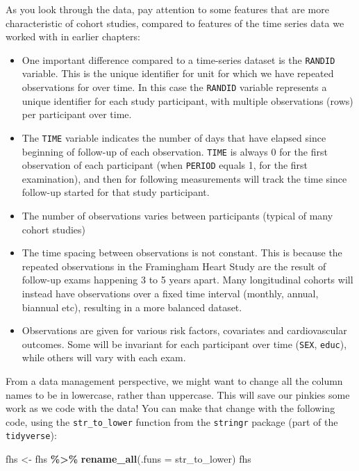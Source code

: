 \documentclass[
]{book}
\newenvironment{Shaded}{\begin{snugshade}}{\end{snugshade}}
\newcommand{\AttributeTok}[1]{\textcolor[rgb]{0.13,0.29,0.53}{#1}}
\newcommand{\FunctionTok}[1]{\textcolor[rgb]{0.13,0.29,0.53}{\textbf{#1}}}
\newcommand{\NormalTok}[1]{#1}
\newcommand{\OtherTok}[1]{\textcolor[rgb]{0.56,0.35,0.01}{#1}}
\newcommand{\SpecialCharTok}[1]{\textcolor[rgb]{0.81,0.36,0.00}{\textbf{#1}}}
\providecommand{\tightlist}{%
  \setlength{\itemsep}{0pt}\setlength{\parskip}{0pt}}
\begin{document}
As you look through the data, pay attention to some features that are more characteristic of cohort studies, compared to features of the time series data we worked with in earlier chapters:

\begin{itemize}
\tightlist
\item
  One important difference compared to a time-series dataset is the \texttt{RANDID} variable. This is the unique identifier for unit for which we have repeated observations for over time.
  In this case the \texttt{RANDID} variable represents a unique identifier for each study participant, with multiple observations (rows) per participant over time.
\item
  The \texttt{TIME} variable indicates the number of days that have elapsed since beginning of follow-up of each observation. \texttt{TIME} is always 0 for the first observation of each participant (when \texttt{PERIOD} equals 1, for the first examination), and then for following measurements will track the time since follow-up started for that study participant.
\item
  The number of observations varies between participants (typical of many cohort studies)
\item
  The time spacing between observations is not constant. This is because the repeated observations in the Framingham Heart Study are the result of follow-up exams happening 3 to 5 years apart. Many longitudinal cohorts will instead have observations over a fixed time interval (monthly, annual, biannual etc), resulting in a more balanced dataset.
\item
  Observations are given for various risk factors, covariates and cardiovascular outcomes. Some will be invariant for each participant over time (\texttt{SEX}, \texttt{educ}), while others will vary with each exam.
\end{itemize}

From a data management perspective, we might want to change all the column names
to be in lowercase, rather than uppercase. This will save our pinkies some
work as we code with the data! You can make that change with the following
code, using the \texttt{str\_to\_lower} function from the \texttt{stringr} package (part of
the \texttt{tidyverse}):

\begin{Shaded}
\begin{Highlighting}[]
\NormalTok{fhs }\OtherTok{\textless{}{-}}\NormalTok{ fhs }\SpecialCharTok{\%\textgreater{}\%} 
  \FunctionTok{rename\_all}\NormalTok{(}\AttributeTok{.funs =}\NormalTok{ str\_to\_lower)}
\NormalTok{fhs}
\end{Highlighting}
\end{Shaded}
\end{document}
